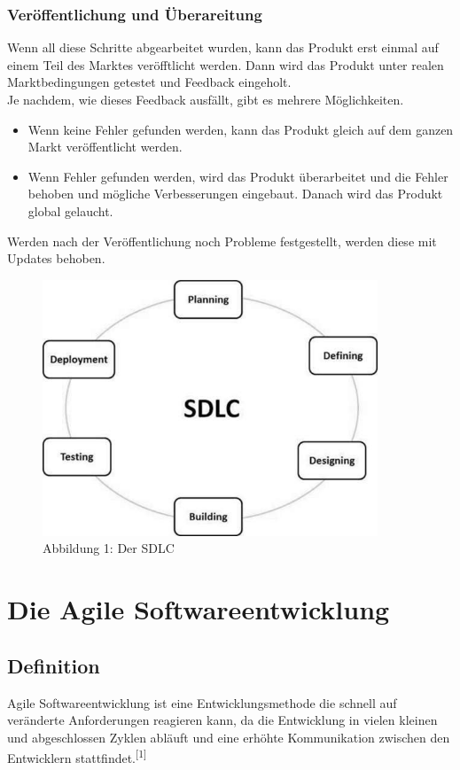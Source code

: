 \documentclass[a4paper, 10pt]{scrartcl}
\begin{document}
\subsubsection{Veröffentlichung und Überareitung}
Wenn all diese Schritte abgearbeitet wurden, kann das Produkt erst einmal auf einem Teil des Marktes veröfftlicht werden. Dann wird das Produkt unter realen Marktbedingungen getestet und Feedback eingeholt.\\
Je nachdem, wie dieses Feedback ausfällt, gibt es mehrere Möglichkeiten. 
\begin{itemize}
\item Wenn keine Fehler gefunden werden, kann das Produkt gleich auf dem ganzen Markt veröffentlicht werden.
\item Wenn Fehler gefunden werden, wird das Produkt überarbeitet und die Fehler behoben und mögliche Verbesserungen eingebaut. Danach wird das Produkt global gelaucht.
\end{itemize}
Werden nach der Veröffentlichung noch Probleme festgestellt, werden diese mit Updates behoben.

\begin{figure}
\begin{center}
\includegraphics[width=10cm]{sdlc.jpg}
\caption{Abbildung 1: Der SDLC}
\end{center}
\end{figure}


\newpage
\section{Die Agile Softwareentwicklung}
\subsection{Definition}
\begin{center}
\large{\glqq{} Agile Softwareentwicklung ist eine Entwicklungsmethode die schnell auf veränderte Anforderungen reagieren kann, da die Entwicklung in vielen kleinen und abgeschlossen Zyklen abläuft und eine erhöhte Kommunikation zwischen den Entwicklern stattfindet.\grqq{}}\textsuperscript{[1]} \\
\end{center}
\end{document}
